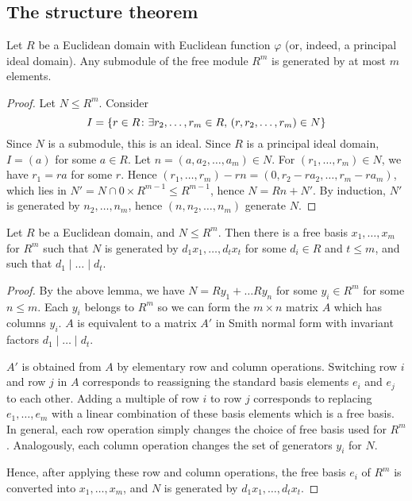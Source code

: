 \subsection{The structure theorem}
\begin{lemma}
	Let \( R \) be a Euclidean domain with Euclidean function \( \varphi \) (or, indeed, a principal ideal domain).
	Any submodule of the free module \( R^m \) is generated by at most \( m \) elements.
\end{lemma}
\begin{proof}
	Let \( N \leq R^m \).
	Consider
	\[ I = \qty{r \in R \colon \exists r_2, \dots, r_m \in R,\, (r,r_2, \dots, r_m) \in N} \]
	Since \( N \) is a submodule, this is an ideal.
	Since \( R \) is a principal ideal domain, \( I = (a) \) for some \( a \in R \).
	Let \( n = (a, a_2, \dots, a_m) \in N \).
	For \( (r_1, \dots, r_m) \in N \), we have \( r_1 = ra \) for some \( r \).
	Hence \( (r_1, \dots, r_m) - rn = (0,r_2 - ra_2, \dots, r_m - ra_m) \), which lies in \( N' = N \cap \qty{0} \times R^{m-1} \leq R^{m-1} \), hence \( N = Rn + N' \).
	By induction, \( N' \) is generated by \( n_2, \dots, n_m \), hence \( (n, n_2, \dots, n_m) \) generate \( N \).
\end{proof}
\begin{theorem}
	Let \( R \) be a Euclidean domain, and \( N \leq R^m \).
	Then there is a free basis \( x_1, \dots, x_m \) for \( R^m \) such that \( N \) is generated by \( d_1 x_1, \dots, d_t x_t \) for some \( d_i \in R \) and \( t \leq m \), and such that \( d_1 \mid \dots \mid d_t \).
\end{theorem}
\begin{proof}
	By the above lemma, we have \( N = R y_1 + \dots R y_n \) for some \( y_i \in R^m \) for some \( n \leq m \).
	Each \( y_i \) belongs to \( R^m \) so we can form the \( m \times n \) matrix \( A \) which has columns \( y_i \).
	\( A \) is equivalent to a matrix \( A' \) in Smith normal form with invariant factors \( d_1 \mid \dots \mid d_t \).

	\( A' \) is obtained from \( A \) by elementary row and column operations.
	Switching row \( i \) and row \( j \) in \( A \) corresponds to reassigning the standard basis elements \( e_i \) and \( e_j \) to each other.
	Adding a multiple of row \( i \) to row \( j \) corresponds to replacing \( e_1, \dots, e_m \) with a linear combination of these basis elements which is a free basis.
	In general, each row operation simply changes the choice of free basis used for \( R^m \).
	Analogously, each column operation changes the set of generators \( y_i \) for \( N \).

	Hence, after applying these row and column operations, the free basis \( e_i \) of \( R^m \) is converted into \( x_1, \dots, x_m \), and \( N \) is generated by \( d_1 x_1, \dots, d_t x_t \).
\end{proof}
